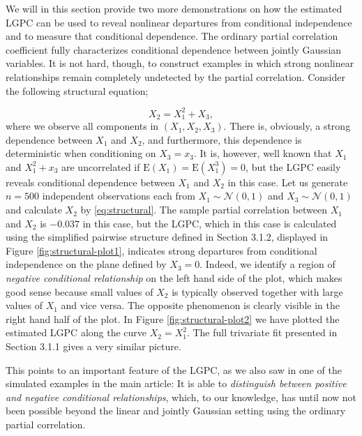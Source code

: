 \documentclass[
  12pt,
  letterpaper]{article}
\numberwithin{equation}{section}
\newcommand{\E}{\textrm{E}}
\begin{document}
We will in this section provide two more demonstrations on how the estimated LGPC can be used to reveal nonlinear departures from conditional independence and to measure that conditional dependence. The ordinary partial correlation coefficient fully characterizes conditional dependence between jointly Gaussian variables. It is not hard, though, to construct examples in which strong nonlinear relationships remain completely undetected by the partial correlation. Consider the following structural equation;

\begin{equation}
X_2 = X_1^2 + X_3,
\label{eq:structural}
\end{equation}
where we observe all components in \((X_1, X_2, X_3)\). There is, obviously, a strong dependence between \(X_1\) and \(X_2\), and furthermore, this dependence is deterministic when conditioning on \(X_3 = x_3\). It is, however, well known that \(X_1\) and \(X_1^2 + x_3\) are uncorrelated if \(\E(X_1) = \E(X_1^3) = 0\), but the LGPC easily reveals conditional dependence between \(X_1\) and \(X_2\) in this case. Let us generate \(n = 500\) independent observations each from \(X_1 \sim \mathcal{N}(0,1)\) and \(X_3 \sim \mathcal{N}(0,1)\) and calculate \(X_2\) by \eqref{eq:structural}. The sample partial correlation between \(X_1\) and \(X_2\) is \(-0.037\) in this case, but the LGPC, which in this case is calculated using the simplified pairwise structure defined in Section 3.1.2, displayed in Figure \ref{fig:structural-plot1}, indicates strong departures from conditional independence on the plane defined by \(X_3 = 0\). Indeed, we identify a region of \emph{negative conditional relationship} on the left hand side of the plot, which makes good sense because small values of \(X_2\) is typically observed together with large values of \(X_1\) and vice versa. The opposite phenomenon is clearly visible in the right hand half of the plot. In Figure \ref{fig:structural-plot2} we have plotted the estimated LGPC along the curve \(X_2 = X_1^2\). The full trivariate fit presented in Section 3.1.1 gives a very similar picture.

This points to an important feature of the LGPC, as we also saw in one of the simulated examples in the main article: It is able to \emph{distinguish between positive and negative conditional relationships}, which, to our knowledge, has until now not been possible beyond the linear and jointly Gaussian setting using the ordinary partial correlation.
\end{document}
